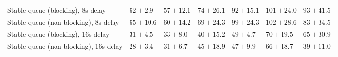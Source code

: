 \begin{table}[H]
{\begin{tabular}{l w{c}{5.0em} w{c}{5.0em} w{c}{5.0em} w{c}{5.0em} w{c}{5.0em} w{c}{5.0em}}
Stable-queue (blocking), 8s delay & $62\pm2.9$ & $57\pm12.1$ & $74\pm26.1$ & $92\pm15.1$ & $101\pm24.0$ & $93\pm41.5$ \\
Stable-queue (non-blocking), 8s delay & $65\pm10.6$ & $60\pm14.2$ & $69\pm24.3$ & $99\pm24.3$ & $102\pm28.6$ & $83\pm34.5$ \\
Stable-queue (blocking), 16s delay & $31\pm4.5$ & $33\pm8.0$ & $40\pm15.2$ & $49\pm4.7$ & $70\pm19.5$ & $65\pm30.9$ \\
Stable-queue (non-blocking), 16s delay & $28\pm3.4$ & $31\pm6.7$ & $45\pm18.9$ & $47\pm9.9$ & $66\pm18.7$ & $39\pm11.0$ \\
\bottomrule
\end{tabular}%
}
\end{table}
